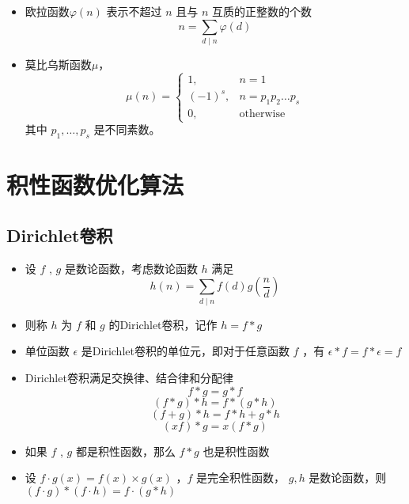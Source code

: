 \documentclass{beamer}
\begin{document}
\begin{frame}
\begin{itemize}[<+-| alert@+>]
	\item 欧拉函数$\varphi(n)$ 表示不超过 $n$ 且与 $n$ 互质的正整数的个数
		$$n=\sum_{d\mid n}\varphi(d)$$
	\item 莫比乌斯函数$\mu$，
		$$\mu(n)=\begin{cases}
				1,&n=1\\
				(-1)^{s},&n=p_{1}p_{2}\dots p_{s}\\
				0,&\text{otherwise}
			\end{cases}$$
		其中 $p_{1},\dots,p_{s}$  是不同素数。
\end{itemize}
\end{frame}

\section{积性函数优化算法}

\subsection{Dirichlet卷积}

\begin{frame}
\begin{itemize}[<+-| alert@+>]
	\item 设 $f$ , $g$ 是数论函数，考虑数论函数 $h$ 满足$$h(n)=\sum_{d\mid n}f(d)g(\frac{n}{d})$$
	\item 则称 $h$ 为 $f$ 和 $g$ 的Dirichlet卷积，记作 $h=f*g$
\end{itemize}
\end{frame}

\begin{frame}
\begin{itemize}[<+-| alert@+>]
	\item 单位函数 $\epsilon$ 是Dirichlet卷积的单位元，即对于任意函数 $f$ ，有 $\epsilon * f=f*\epsilon=f$
	\item Dirichlet卷积满足交换律、结合律和分配律
		$$f*g=g*f$$
		$$(f*g)*h=f*(g*h)$$
		$$(f+g)*h=f*h+g*h$$
		$$(xf)*g=x(f*g)$$
	\item 如果 $f$ , $g$ 都是积性函数，那么 $f*g$ 也是积性函数
	\item 设 $f\cdot g(x)=f(x)\times g(x)$ ，$f$ 是完全积性函数， $g,h$ 是数论函数，则 $(f\cdot g)*(f\cdot h)=f\cdot (g*h)$
\end{itemize}
\end{frame}
\end{document}
